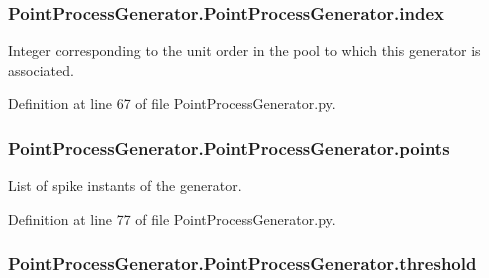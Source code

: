 \subsubsection[{\texorpdfstring{index}{index}}]{\setlength{\rightskip}{0pt plus 5cm}Point\+Process\+Generator.\+Point\+Process\+Generator.\+index}\hypertarget{class_point_process_generator_1_1_point_process_generator_a57f6c8af8fd3d37ed8ab2f4abe9be5d8}{}\label{class_point_process_generator_1_1_point_process_generator_a57f6c8af8fd3d37ed8ab2f4abe9be5d8}


Integer corresponding to the unit order in the pool to which this generator is associated. 



Definition at line 67 of file Point\+Process\+Generator.\+py.

\subsubsection[{\texorpdfstring{points}{points}}]{\setlength{\rightskip}{0pt plus 5cm}Point\+Process\+Generator.\+Point\+Process\+Generator.\+points}\hypertarget{class_point_process_generator_1_1_point_process_generator_ab36d31f34c0330e13ae9732d53984bab}{}\label{class_point_process_generator_1_1_point_process_generator_ab36d31f34c0330e13ae9732d53984bab}


List of spike instants of the generator. 



Definition at line 77 of file Point\+Process\+Generator.\+py.

\subsubsection[{\texorpdfstring{threshold}{threshold}}]{\setlength{\rightskip}{0pt plus 5cm}Point\+Process\+Generator.\+Point\+Process\+Generator.\+threshold}\hypertarget{class_point_process_generator_1_1_point_process_generator_abcb23e09b752b797a1f11f2679373ca1}{}\label{class_point_process_generator_1_1_point_process_generator_abcb23e09b752b797a1f11f2679373ca1}


